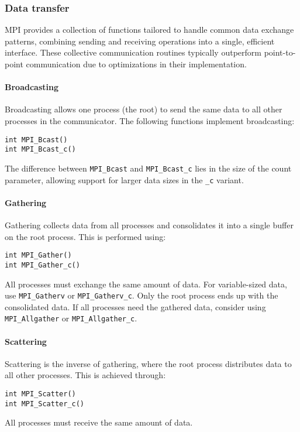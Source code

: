 \subsubsection{Data transfer}
MPI provides a collection of functions tailored to handle common data exchange patterns, combining sending and receiving operations into a single, efficient interface. 
These collective communication routines typically outperform point-to-point communication due to optimizations in their implementation.

\paragraph*{Broadcasting}
Broadcasting allows one process (the root) to send the same data to all other processes in the communicator. The following functions implement broadcasting:
\begin{lstlisting}[style=C]
int MPI_Bcast()
int MPI_Bcast_c()
\end{lstlisting}
The difference between \texttt{MPI\_Bcast} and \texttt{MPI\_Bcast\_c} lies in the size of the count parameter, allowing support for larger data sizes in the \texttt{\_c} variant.

\paragraph*{Gathering}
Gathering collects data from all processes and consolidates it into a single buffer on the root process.
This is performed using:
\begin{lstlisting}[style=C]
int MPI_Gather()
int MPI_Gather_c()
\end{lstlisting}
All processes must exchange the same amount of data. For variable-sized data, use \texttt{MPI\_Gatherv} or \texttt{MPI\_Gatherv\_c}.
Only the root process ends up with the consolidated data. If all processes need the gathered data, consider using \texttt{MPI\_Allgather} or \texttt{MPI\_Allgather\_c}.

\paragraph*{Scattering}
Scattering is the inverse of gathering, where the root process distributes data to all other processes. 
This is achieved through:
\begin{lstlisting}[style=C]
int MPI_Scatter()
int MPI_Scatter_c()
\end{lstlisting}
All processes must receive the same amount of data. 